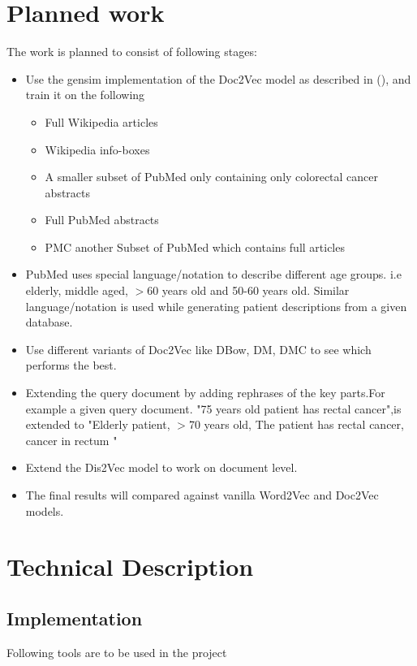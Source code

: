 \documentclass[12pt,a4paper] {article}
\begin{document}
\section*{Planned work} 
The work is planned to consist of following stages:
\begin{itemize}
	\item Use the gensim \cite{rehurek_lrec} implementation of the Doc2Vec model as described in (\cite{le2014distributed}), and train it on
	the following
	\begin{itemize}
		\item Full Wikipedia articles 
		\item Wikipedia info-boxes
		\item A smaller subset of PubMed only containing only  colorectal cancer abstracts
		\item Full PubMed abstracts
		\item PMC another Subset of PubMed which contains full articles
	\end{itemize}
	
	
	\item PubMed uses special language/notation to describe different age groups. i.e elderly, middle aged, $>$60 years old and 50-60 years old. Similar language/notation is used while generating patient descriptions from a given database.
	
	\item Use different variants of Doc2Vec like DBow, DM, DMC to see which performs the best.

	\item Extending the query document by adding rephrases of the key parts.For example  a given query document. "75 years old patient has rectal cancer",is extended to "Elderly patient, $>$70 years old, The patient has rectal cancer, cancer in rectum "  
	
	\item Extend the Dis2Vec \cite{ghosh2016characterizing} model to work on document level.
	\item The final results will compared against vanilla Word2Vec and Doc2Vec models.
	
	
\end{itemize}



\section*{Technical Description} 
\subsection*{Implementation}
Following tools are to be used in the project
\end{document}
